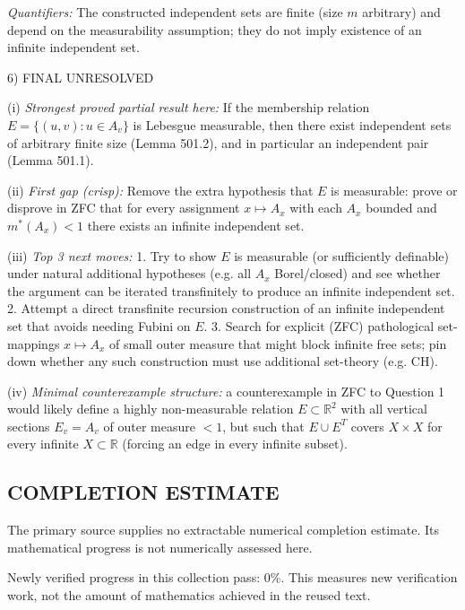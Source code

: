 \emph{Quantifiers:} The constructed independent sets are finite (size $m$ arbitrary) and depend on the measurability assumption; they do not imply existence of an infinite independent set.

6) FINAL
UNRESOLVED

(i) \emph{Strongest proved partial result here:} If the membership relation $E=\{(u,v):u\in A_v\}$ is Lebesgue measurable, then there exist independent sets of arbitrary finite size (Lemma 501.2), and in particular an independent pair (Lemma 501.1).

(ii) \emph{First gap (crisp):} Remove the extra hypothesis that $E$ is measurable: prove or disprove in ZFC that for every assignment $x\mapsto A_x$ with each $A_x$ bounded and $m^*(A_x)<1$ there exists an infinite independent set.

(iii) \emph{Top 3 next moves:}
1. Try to show $E$ is measurable (or sufficiently definable) under natural additional hypotheses (e.g. all $A_x$ Borel/closed) and see whether the argument can be iterated transfinitely to produce an infinite independent set.
2. Attempt a direct transfinite recursion construction of an infinite independent set that avoids needing Fubini on $E$.
3. Search for explicit (ZFC) pathological set-mappings $x\mapsto A_x$ of small outer measure that might block infinite free sets; pin down whether any such construction must use additional set-theory (e.g. CH).

(iv) \emph{Minimal counterexample structure:} a counterexample in ZFC to Question 1 would likely define a highly non-measurable relation $E\subset\mathbb R^2$ with all vertical sections $E_v=A_v$ of outer measure $<1$, but such that $E\cup E^T$ covers $X\times X$ for every infinite $X\subset\mathbb R$ (forcing an edge in every infinite subset).




\subsection*{COMPLETION ESTIMATE}
The primary source supplies no extractable numerical completion estimate. Its mathematical progress is not numerically assessed here.

Newly verified progress in this collection pass: $0\%$. This measures new verification work, not the amount of mathematics achieved in the reused text.
